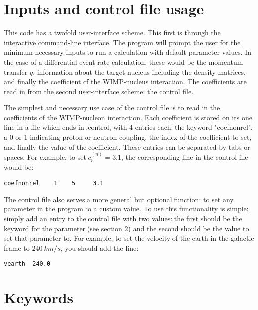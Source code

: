 \documentclass[11pt]{amsart}
\begin{document}
\section{Inputs and control file usage}
This code has a twofold user-interface scheme. This first is through the interactive command-line interface. The program will prompt the user for the minimum necessary inputs to run a calculation with default parameter values. In the case of a differential event rate calculation, these would be the momentum transfer $q$, information about the target nucleus including the density matrices, and finally the coefficient of the WIMP-nucleus interaction. The coefficients are read in from the second user-interface scheme: the control file. 

The simplest and necessary use case of the control file is to read in the coefficients of the WIMP-nucleon interaction. Each coefficient is stored on its one line in a file which ends in .control, with 4 entries each: the keyword "coefnonrel", a 0 or 1 indicating proton or neutron coupling, the index of the coefficient to set, and finally the value of the coefficient. These entries can be separated by tabs or spaces. For example, to set $c_5^{(n)}=3.1$, the corresponding line in the control file would be:
\begin{verbatim}
coefnonrel    1    5     3.1
\end{verbatim}

The control file also serves a more general but optional function: to set any parameter in the program to a custom value. To use this functionality is simple: simply add an entry to the control file with two values: the first should be the keyword for the parameter (see section \ref{keywords}) and the second should be the value to set that parameter to. For example, to set the velocity of the earth in the galactic frame to $240\ km/s$, you should add the line:
\begin{verbatim}
vearth  240.0
\end{verbatim}

\section{Keywords}\label{keywords}
\end{document}
